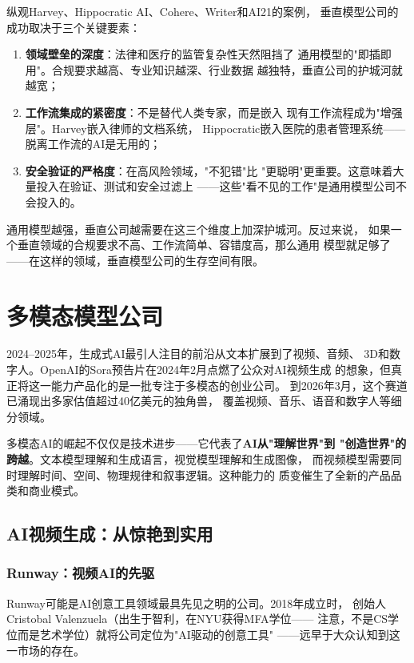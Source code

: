 \begin{corebox}[垂直模型公司的战略启示]
纵观Harvey、Hippocratic AI、Cohere、Writer和AI21的案例，
垂直模型公司的成功取决于三个关键要素：
\begin{enumerate}
  \item \textbf{领域壁垒的深度}：法律和医疗的监管复杂性天然阻挡了
    通用模型的"即插即用"。合规要求越高、专业知识越深、行业数据
    越独特，垂直公司的护城河就越宽；
  \item \textbf{工作流集成的紧密度}：不是替代人类专家，而是嵌入
    现有工作流程成为"增强层"。Harvey嵌入律师的文档系统，
    Hippocratic嵌入医院的患者管理系统——脱离工作流的AI是无用的；
  \item \textbf{安全验证的严格度}：在高风险领域，"不犯错"比
    "更聪明"更重要。这意味着大量投入在验证、测试和安全过滤上
    ——这些"看不见的工作"是通用模型公司不会投入的。
\end{enumerate}
通用模型越强，垂直公司越需要在这三个维度上加深护城河。反过来说，
如果一个垂直领域的合规要求不高、工作流简单、容错度高，那么通用
模型就足够了——在这样的领域，垂直模型公司的生存空间有限。
\end{corebox}


\section{多模态模型公司}
\label{sec:models-multimodal}

2024--2025年，生成式AI最引人注目的前沿从文本扩展到了视频、音频、
3D和数字人。OpenAI的Sora预告片在2024年2月点燃了公众对AI视频生成
的想象，但真正将这一能力产品化的是一批专注于多模态的创业公司。
到2026年3月，这个赛道已涌现出多家估值超过40亿美元的独角兽，
覆盖视频、音乐、语音和数字人等细分领域。

多模态AI的崛起不仅仅是技术进步——它代表了\textbf{AI从"理解世界"到
"创造世界"的跨越}。文本模型理解和生成语言，视觉模型理解和生成图像，
而视频模型需要同时理解时间、空间、物理规律和叙事逻辑。这种能力的
质变催生了全新的产品品类和商业模式。

\subsection{AI视频生成：从惊艳到实用}
\label{subsec:video-gen}

\subsubsection{Runway：视频AI的先驱}
Runway可能是AI创意工具领域最具先见之明的公司。2018年成立时，
创始人Cristobal Valenzuela（出生于智利，在NYU获得MFA学位——
注意，不是CS学位而是艺术学位）就将公司定位为"AI驱动的创意工具"
——远早于大众认知到这一市场的存在。

